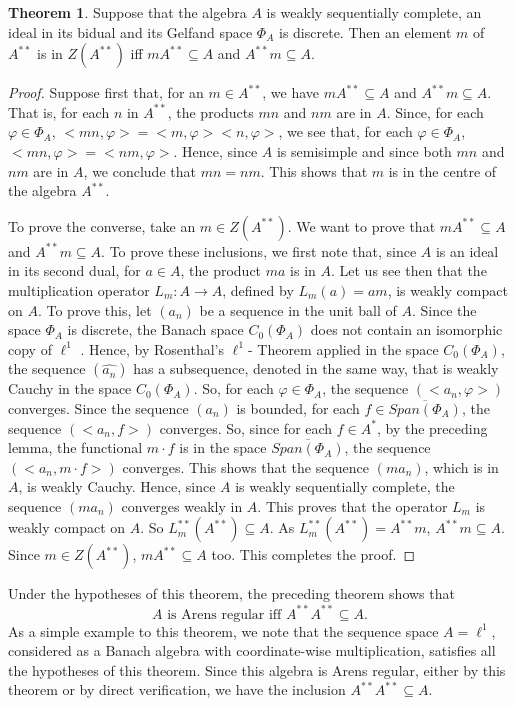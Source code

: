 \documentclass[12pt, twoside, leqno]{article}
\theoremstyle{definition}
\newtheorem{theorem}{Theorem}[section]
\theoremstyle{definition}
\numberwithin{equation}{section}
\begin{document}
\begin{theorem} Suppose that the algebra $ A $ is weakly sequentially complete, an ideal in its bidual and its Gelfand space $ \Phi_{A} $ is discrete. Then an element $ m $ of $ A^{**} $ is in $ Z(A^{**}) $ iff $ mA^{**}\subseteq A $ and $ A^{**}m\subseteq A $. 	
\end{theorem}
\begin{proof}
	Suppose first that, for an $ m\in A^{**} $, we have $ mA^{**}\subseteq A $ and $ A^{**}m\subseteq A $. That is, for each $ n $ in $ A^{**} $, the products $ mn $ and $ nm $ are in $ A $. Since, for each $ \varphi\in \Phi_{A} $, $ <mn,\varphi>=<m,\varphi> <n,\varphi> $, we see that, for each  $ \varphi\in \Phi_{A} $, $ <mn,\varphi>=<nm,\varphi>  $. Hence, since $ A $ is semisimple and since both $ mn $ and $ nm $ are in $ A $, we conclude that $ mn=nm $. This shows that $ m $ is in the centre of the algebra $ A^{**} $.\vspace{2mm}
	
	To prove the converse, take an $ m\in Z(A^{**}) $. We want to prove that $ mA^{**}\subseteq A $ and $ A^{**}m\subseteq A $. To prove these inclusions, we first note that, since $ A $ is an ideal in its second dual, for $ a\in A $, the product $ ma $ is in $ A $. Let us see then that the multiplication operator $ L_{m}:A\rightarrow A $, defined by $ L_{m}(a)=am $, is weakly compact on $ A $. To prove this, let $ (a_{n}) $ be a sequence in the unit ball of $ A $. Since the space $ \Phi_{A} $ is discrete, the Banach space $ C_{0}(\Phi_{A}) $ does not contain an isomorphic copy of $ \ell^{1} $ \cite {semadeni_01}. Hence, by Rosenthal's $ \ell^{1} $- Theorem applied in the space $C_{0}(\Phi_{A})$, the sequence $ (\hat{a_{n}}) $ has a subsequence, denoted in the same way, that is weakly Cauchy in the space $ C_{0}(\Phi_{A}) $. So, for each $ \varphi\in \Phi_{A} $, the sequence $ (<a_{n},\varphi>) $ converges. Since the sequence $ (a_{n}) $ is bounded, for each $ f\in\overline{Span(\Phi_{A})} $, the sequence $ (<a_{n},f>) $ converges. So, since for each $ f\in A^{*} $, by the preceding lemma, the functional $ m\cdot f $ is in the space $ \overline{Span(\Phi_{A})} $, the sequence $ (<a_{n},m\cdot f>) $ converges. This shows that the sequence $ (ma_{n}) $, which is in $ A $, is weakly Cauchy. Hence, since $ A $ is weakly sequentially complete, the sequence $ (ma_{n}) $ converges weakly in $ A $. This proves that the operator $ L_{m} $ is weakly compact on $ A $. So $ L_{m}^{**}(A^{**})\subseteq A $. As $ L_{m}^{**}(A^{**})=A^{**}m $, $ A^{**}m\subseteq A $. Since $ m\in Z(A^{**}) $, $ mA^{**}\subseteq A $ too. This completes the proof.
 \end{proof}
 Under the hypotheses of this theorem, the preceding theorem shows that $$A \text{ is Arens regular iff } A^{**}A^{**}\subseteq A. $$ As a simple example to this theorem, we note that the sequence space $ A=\ell^{1} $, considered as a Banach algebra with coordinate-wise multiplication, satisfies all the hypotheses of this theorem. Since this algebra is Arens regular, either by this theorem or by direct verification, we have the inclusion $ A^{**}A^{**}\subseteq A $.\vspace{2mm}
\end{document}
